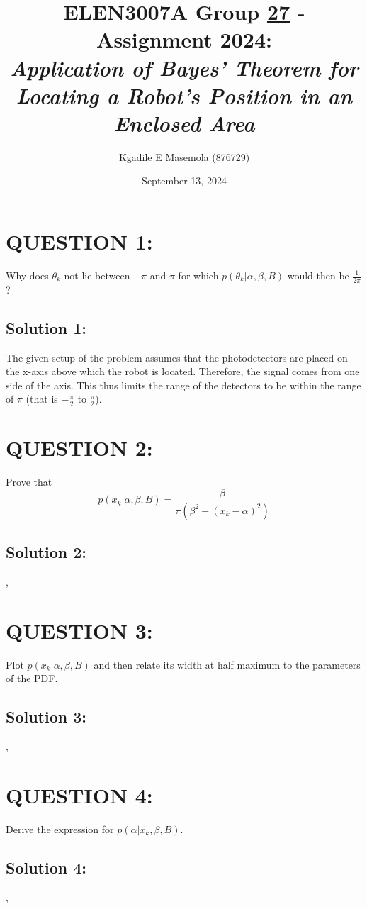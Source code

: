 \documentclass[a4paper,11pt]{article}
\title{ELEN3007A Group \underline{27} - Assignment 2024: \\ 
\large \emph{Application of Bayes’ Theorem for Locating a Robot’s
Position in an Enclosed Area}}
\author{Kgadile E Masemola (876729)}
\date{September 13, 2024}
\begin{document}
\maketitle

\section{QUESTION 1:}  Why does $\theta_k$ not lie between $- \pi$ and $\pi$ for which $p(\theta_k | \alpha, \beta, B)$ would then be $\frac{1}{2\pi}$?

\subsection{Solution 1:}
The given setup of the problem assumes that the photodetectors are placed on the x-axis above which the robot is located. Therefore, the signal comes from one side of the axis. This thus limits the range of the detectors to be within the range of $\pi$ (that is $-\frac{\pi}{2}$ to $\frac{\pi}{2}$). 

\section{QUESTION 2:}
Prove that
\begin{equation}
	p(x_k | \alpha, \beta, B) = \frac{\beta}{\pi (\beta^2 + (x_k - \alpha)^2)}
\end{equation}
\subsection{Solution 2:}
,

\section{QUESTION 3:}
Plot $p(x_k | \alpha, \beta, B)$ and then relate its width at half maximum to the parameters of the PDF.

\subsection{Solution 3:}
,

\section{QUESTION 4:}
Derive the expression for $p(\alpha | x_k, \beta, B)$.

\subsection{Solution 4:}
,
\end{document}
